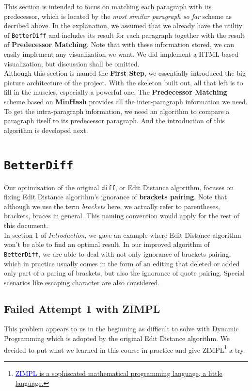 \documentclass{article}
\begin{document}
This section is intended to focus on matching each paragraph with its predecessor, which is located by the \textit{most similar paragraph so far} scheme as decribed above. In the explanation, we assumed that we already have the utility of \texttt{BetterDiff} and includes its result for each paragraph together with the result of \textbf{Predecessor Matching}. Note that with these information stored, we can easily implement any visualization we want. We did implement a HTML-based visualization, but discussion shall be omitted. \\

Although this section is named the \textbf{First Step}, we essentially introduced the big picture architecture of the project. With the skeleton built out, all that left is to fill in the muscles, especially a powerful one. The \textbf{Predecessor Matching} scheme based on \textbf{MinHash} provides all the inter-paragraph information we need. To get the intra-paragraph information, we need an algorithm to compare a paragraph itself to its predecessor paragraph. And the introduction of this algorithm is developed next.

\pagebreak
\section{\texttt{BetterDiff}}
Our optimization of the original \texttt{diff}, or Edit Distance algorithm, focuses on fixing Edit Distance algorithm's ignorance of \textbf{brackets pairing}. Note that although we use the term \textit{brackets} here, we actually refer to parentheses, brackets, braces in general. This naming convention would apply for the rest of this document. \\

In section 1 of \textit{Introduction}, we gave an example where Edit Distance algorithm won't be able to find an optimal result. In our improved algorithm of \texttt{BetterDiff}, we are able to deal with not only ignorance of brackets pairing, which in practice usually comes in the form of an editing that deleted or added only part of a paring of brackets, but also the ignorance of quote pairing. Special scenarios like escaping character are also considered.

\subsection{Failed Attempt 1 with ZIMPL}
This problem appears to us in the beginning as difficult to solve with Dynamic Programming which is adopted by the original Edit Distance algorithm. We decided to put what we learned in this course in practice and give ZIMPL\footnote{\href{http://zimpl.zib.de}{\textcolor{blue}{ZIMPL} is a sophiscated mathematical programming language, a little language.}} a try. \\
\end{document}
